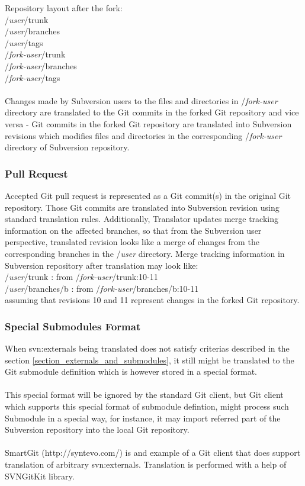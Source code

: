 Repository layout after the fork:\\

/\emph{user}/trunk\\
/\emph{user}/branches\\
/\emph{user}/tags\\
/\emph{fork-user}/trunk\\
/\emph{fork-user}/branches\\
/\emph{fork-user}/tags\\\\
Changes made by Subversion users to the files and directories in /\emph{fork-user} directory are translated to the Git commits in the forked Git
repository and vice versa - Git commits in the forked Git repository are translated into Subversion revisions which modifies files
and directories in the corresponding /\emph{fork-user} directory of Subversion repository.

\subsubsection{Pull Request}

Accepted Git pull request is represented as a Git commit(s) in the original Git repository. Those Git commits are translated into Subversion
revision using standard translation rules. Additionally, Translator updates merge tracking information on the affected branches, so that
from the Subversion user perspective, translated revision looks like a merge of changes from the corresponding branches in the /\emph{user} directory. 
Merge tracking information in Subversion repository after translation may look like:\\

/\emph{user}/trunk : from /\emph{fork-user}/trunk:10-11\\
/\emph{user}/branches/b : from /\emph{fork-user}/branches/b:10-11\\

assuming that revisions 10 and 11 represent changes in the forked Git repository.

\subsubsection{Special Submodules Format}
When svn:externals being translated does not satisfy criterias described in the section \ref{section_externals_and_submodules},
it still might be translated to the Git submodule definition which is however stored in a special format.
\\\\
This special format will be ignored by the standard Git client, but Git client which supports this special format of submodule defintion, 
might process such Submodule in a special way, for instance, it may import referred part of the Subversion repository into the local Git repository.
\\\\
SmartGit (http://syntevo.com/) is and example of a Git client that does support translation of arbitrary svn:externals. Translation
is performed with a help of SVNGitKit library.

